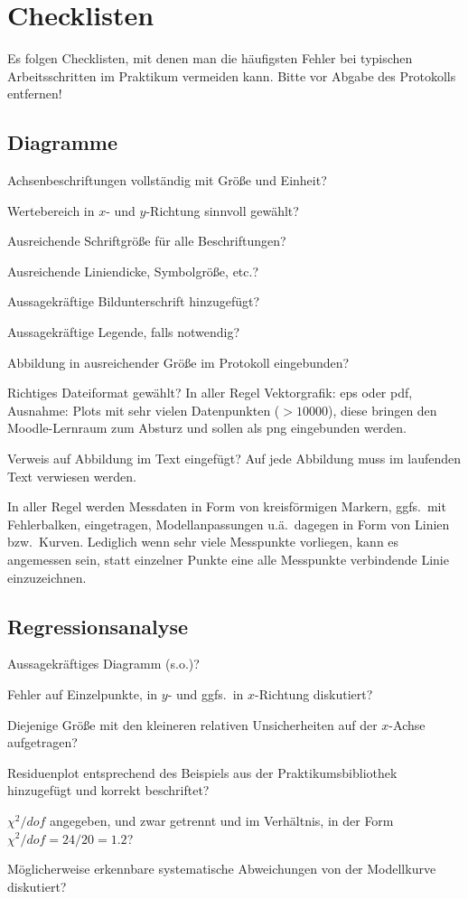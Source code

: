 \documentclass[twoside]{protokoll}
\begin{document}
\section*{Checklisten}
Es folgen Checklisten, mit denen man die häufigsten Fehler bei
typischen Arbeitsschritten im Praktikum vermeiden kann. Bitte vor
Abgabe des Protokolls entfernen!

\subsection*{Diagramme}
\begin{checklist}
\item Achsenbeschriftungen vollständig mit Größe und Einheit?
\item Wertebereich in $x$- und $y$-Richtung sinnvoll gewählt?
\item Ausreichende Schriftgröße für alle Beschriftungen?
\item Ausreichende Liniendicke, Symbolgröße, etc.?
\item Aussagekräftige Bildunterschrift hinzugefügt?
\item Aussagekräftige Legende, falls notwendig?
\item Abbildung in ausreichender Größe im Protokoll eingebunden?
\item Richtiges Dateiformat gewählt? In aller Regel Vektorgrafik: eps
  oder pdf, Ausnahme: Plots mit sehr vielen Datenpunkten ($>10000$),
  diese bringen den Moodle-Lernraum zum Absturz und sollen als png
  eingebunden werden.
\item Verweis auf Abbildung im Text eingefügt? Auf jede Abbildung muss
  im laufenden Text verwiesen werden.
\end{checklist}

\noindent In aller Regel werden Messdaten in Form von kreisförmigen Markern,
ggfs.~mit Fehlerbalken, eingetragen, Modellanpassungen u.ä.~dagegen in
Form von Linien bzw.~Kurven. Lediglich wenn sehr viele Messpunkte
vorliegen, kann es angemessen sein, statt einzelner Punkte eine alle
Messpunkte verbindende Linie einzuzeichnen.

\subsection*{Regressionsanalyse}
\begin{checklist}
\item Aussagekräftiges Diagramm (s.o.)?
\item Fehler auf Einzelpunkte, in $y$- und ggfs.~in $x$-Richtung
  diskutiert?
\item Diejenige Größe mit den kleineren relativen Unsicherheiten auf
  der $x$-Achse aufgetragen?
\item Residuenplot entsprechend des Beispiels aus der
  Praktikumsbibliothek hinzugefügt und korrekt beschriftet?
\item $\chi^2/dof$ angegeben, und zwar getrennt und im Verhältnis, in
  der Form $\chi^2/dof=24/20=1.2$?
\item Möglicherweise erkennbare systematische Abweichungen von der
  Modellkurve diskutiert?
\end{checklist}
\end{document}
